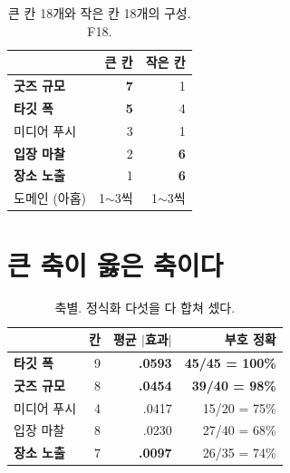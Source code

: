 \documentclass[10pt]{article}
\begin{document}

\begin{table}[t]
\centering\tsize
\caption{큰 칸 18개와 작은 칸 18개의 구성. F18.}
\begin{tabular}{lrr}
\toprule
& 큰 칸 & 작은 칸 \\
\midrule
\textbf{굿즈 규모} & \textbf{7} & 1 \\
\textbf{타깃 폭} & \textbf{5} & 4 \\
미디어 푸시 & 3 & 1 \\
\textbf{입장 마찰} & 2 & \textbf{6} \\
\textbf{장소 노출} & 1 & \textbf{6} \\
\midrule
도메인 (아홉) & 1$\sim$3씩 & 1$\sim$3씩 \\
\bottomrule
\end{tabular}
\end{table}


\section{큰 축이 옳은 축이다}

\begin{table}[t]
\centering\tsize
\caption{축별. 정식화 다섯을 다 합쳐 셌다.}
\begin{tabular}{lrrr}
\toprule
& 칸 & 평균 $|$효과$|$ & 부호 정확 \\
\midrule
\textbf{타깃 폭} & 9 & \textbf{.0593} & \textbf{45/45 = 100\%} \\
\textbf{굿즈 규모} & 8 & \textbf{.0454} & \textbf{39/40 = 98\%} \\
미디어 푸시 & 4 & .0417 & 15/20 = 75\% \\
입장 마찰 & 8 & .0230 & 27/40 = 68\% \\
\textbf{장소 노출} & 7 & \textbf{.0097} & 26/35 = 74\% \\
\bottomrule
\end{tabular}
\end{table}
\end{document}

